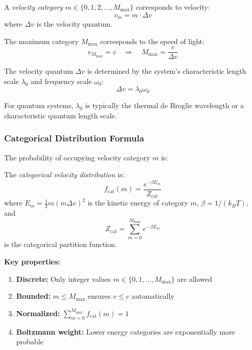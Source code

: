 \begin{definition}
A \textit{velocity category} $m \in \{0, 1, 2, \ldots, M_{\max}\}$ corresponds to velocity:
\begin{equation}
v_m = m \cdot \Delta v
\end{equation}
where $\Delta v$ is the velocity quantum.
\end{definition}

The maximum category $M_{\max}$ corresponds to the speed of light:
\begin{equation}
v_{M_{\max}} = c \quad \Rightarrow \quad M_{\max} = \frac{c}{\Delta v}
\end{equation}

The velocity quantum $\Delta v$ is determined by the system's characteristic length scale $\lambda_0$ and frequency scale $\omega_0$:
\begin{equation}
\Delta v = \lambda_0 \omega_0
\end{equation}

For quantum systems, $\lambda_0$ is typically the thermal de Broglie wavelength or a characteristic quantum length scale.

\subsubsection{Categorical Distribution Formula}

The probability of occupying velocity category $m$ is:

\begin{definition}
The \textit{categorical velocity distribution} is:
\begin{equation}
\boxed{f_{\text{cat}}(m) = \frac{e^{-\beta E_m}}{Z_{\text{cat}}}}
\label{eq:categorical_distribution}
\end{equation}
where $E_m = \frac{1}{2}m(m\Delta v)^2$ is the kinetic energy of category $m$, $\beta = 1/(k_B T)$, and
\begin{equation}
Z_{\text{cat}} = \sum_{m=0}^{M_{\max}} e^{-\beta E_m}
\end{equation}
is the categorical partition function.
\end{definition}

\textbf{Key properties:}
\begin{enumerate}
\item \textbf{Discrete:} Only integer values $m \in \{0, 1, \ldots, M_{\max}\}$ are allowed
\item \textbf{Bounded:} $m \leq M_{\max}$ ensures $v \leq c$ automatically
\item \textbf{Normalized:} $\sum_{m=0}^{M_{\max}} f_{\text{cat}}(m) = 1$
\item \textbf{Boltzmann weight:} Lower energy categories are exponentially more probable
\end{enumerate}

